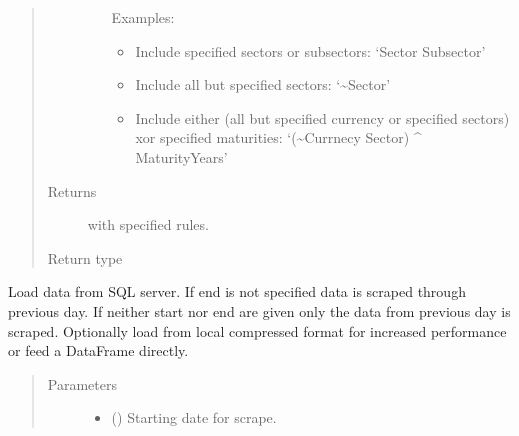 \documentclass[letterpaper,10pt,english]{report}
\begin{document}
\begin{fulllineitems}
\begin{fulllineitems}
\begin{quote}
\begin{description}
\begin{itemize}
Examples:
\begin{itemize}
\item {} 
Include specified sectors or subsectors:
‘Sector \textbar{} Subsector’

\item {} 
Include all but specified sectors:
‘\textasciitilde{}Sector’

\item {} 
Include either (all but specified currency or specified
sectors) xor specified maturities:
‘(\textasciitilde{}Currnecy \textbar{} Sector) \textasciicircum{} MaturityYears’

\end{itemize}


\end{itemize}

\item[{Returns}] \leavevmode
{\hyperref[\detokenize{index:lgimapy.index.Index}]{}} with specified rules.

\item[{Return type}] \leavevmode
{\hyperref[\detokenize{index:lgimapy.index.Index}]{}}

\end{description}\end{quote}

\end{fulllineitems}


\begin{fulllineitems}
\label{\detokenize{index:lgimapy.index.IndexBuilder.load}}
Load data from SQL server. If end is not specified data is scraped
through previous day. If neither start nor end are given only the
data from previous day is scraped. Optionally load from local
compressed format for increased performance or feed a DataFrame
directly.
\begin{quote}\begin{description}
\item[{Parameters}] \leavevmode\begin{itemize}
\item {} 
 (\sphinxstyleliteralemphasis{\sphinxupquote{, }}\sphinxstyleliteralemphasis{\sphinxupquote{, }}) \textendash{} Starting date for scrape.


\end{itemize}
\end{description}
\end{quote}
\end{fulllineitems}
\end{fulllineitems}
\end{document}
